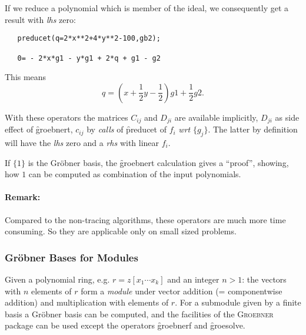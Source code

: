 If we reduce a polynomial which is member of the ideal, we
consequently get a result with {\it lhs} zero:
\begin{verbatim}
   preducet(q=2*x**2+4*y**2-100,gb2);

   0= - 2*x*g1 - y*g1 + 2*q + g1 - g2
\end{verbatim}

This means
\[ q = ( x + \frac{1}{2} y - \frac{1}{2}) g1 + \frac{1}{2} g2.
\]

With these operators the matrices $C_{ij}$ and $D_{ji}$ are available
implicitly, $D_{ji}$ as side effect of \f{groebnert}, $c_{ij}$ by \emph{calls}
of \f{preducet} of $f_i$ {\it wrt} $\{g_j\}$. The latter by definition will
have the {\it lhs} zero and a {\it rhs} with linear $f_i$.

If $\{1\}$ is the Gr\"obner basis, the \f{groebnert} calculation gives
a ``proof'', showing,  how  $1$ can be computed as combination of the
input polynomials.

\paragraph{Remark:} Compared to the non-tracing algorithms, these
operators are much more time consuming. So they are applicable
only on small sized problems.

\subsubsection{Gr\"obner Bases for Modules}

Given a polynomial ring, e.g. $r=z[x_1 \cdots x_k]$ and
an integer $n>1$: the vectors with $n$ elements of $r$
form a \emph{module} under vector addition (= componentwise addition)
and multiplication with elements of $r$. For a submodule
given by a finite basis a Gr\"obner basis
can be computed, and the facilities of the \textsc{Groebner} package
can be used except the operators \f{groebnerf} and \f{groesolve}.

